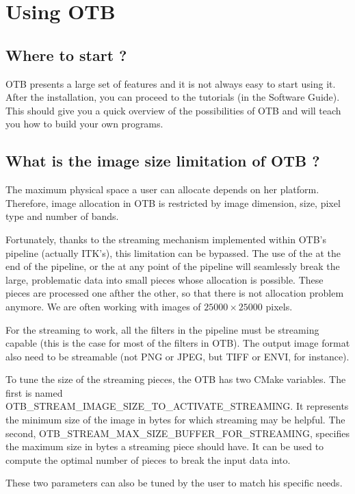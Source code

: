 \section{Using OTB}

\subsection{Where to start ?}

OTB presents a large set of features and it is not always easy to start using it.
After the installation, you can proceed to the tutorials (in the Software Guide).
This should give you a quick overview of the possibilities of OTB and will teach
you how to build your own programs.

\subsection{What is the image size limitation of OTB ?}

The maximum physical space a user can allocate depends on her platform. Therefore,
image allocation in OTB is restricted by image dimension, size, pixel type and number
of bands.

Fortunately, thanks to the streaming mechanism implemented within
OTB's pipeline (actually ITK's), this limitation can be bypassed. The
use of the  at the end of the pipeline,
or the  at any point of the pipeline will
seamlessly break the large, problematic data into small pieces whose
allocation is possible. These pieces are processed one afther the
other, so that there is not allocation problem anymore. We are often working with
images of $25000 \times 25000$ pixels.

For the streaming to work, all the filters in the pipeline must be streaming capable
(this is the case for most of the filters in OTB). The output image format also need to be
streamable (not PNG or JPEG, but TIFF or ENVI, for instance).

To tune the size of the streaming pieces, the OTB has
two CMake variables. The first is named
OTB\_STREAM\_IMAGE\_SIZE\_TO\_ACTIVATE\_STREAMING. It represents the
minimum size of the image in bytes for which streaming may be helpful. The
second, OTB\_STREAM\_MAX\_SIZE\_BUFFER\_FOR\_STREAMING, specifies the
maximum size in bytes a streaming piece should have. It can be used to
compute the optimal number of pieces to break the input data into.

These two parameters can also be tuned by the user to match his specific needs.


